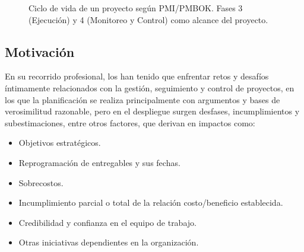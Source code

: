 \documentclass[12pt]
{charter}
\begin{document}
\begin{figure}[h]
  \centering


  \caption{Ciclo de vida de un proyecto según PMI/PMBOK. Fases 3 (Ejecución) y 4 (Monitoreo y Control) como alcance del proyecto.}
  \label{fig:ciclo-pmi}
\end{figure}

\subsection{Motivación}

En su recorrido profesional, los  han tenido que enfrentar retos y desafíos íntimamente relacionados con la gestión, seguimiento y control de proyectos, en los que la planificación se realiza  principalmente con argumentos y bases de verosimilitud razonable, pero en el despliegue surgen desfases, incumplimientos y subestimaciones, entre otros factores, que derivan en impactos como:

\begin{itemize}
	\item Objetivos estratégicos.
	\item Reprogramación de entregables y sus fechas.
	\item Sobrecostos.
	\item Incumplimiento parcial o total de la relación costo/beneficio establecida.
	\item Credibilidad y confianza en el equipo de trabajo.
	\item Otras iniciativas dependientes en la organización.
\end{itemize}
\end{document}

